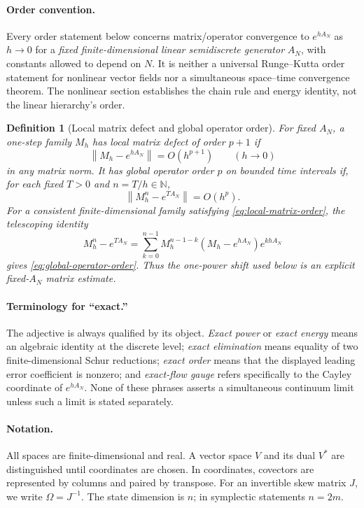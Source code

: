\documentclass[11pt,a4paper]{article}
\newtheorem{definition}[theorem]{Definition}
\newcommand{\norm}[1]{\left\lVert #1\right\rVert}
\begin{document}
\paragraph{Order convention.}
Every order statement below concerns matrix/operator convergence to
\(e^{hA_N}\) as \(h\to0\) for a \emph{fixed finite-dimensional linear
semidiscrete generator} \(A_N\), with constants allowed to depend on
\(N\).  It is neither a universal Runge--Kutta order statement for
nonlinear vector fields nor a simultaneous space--time convergence
theorem.  The nonlinear section establishes the chain rule and energy
identity, not the linear hierarchy's order.

\begin{definition}[Local matrix defect and global operator order]
\label{def:matrix-order}
For fixed \(A_N\), a one-step family \(M_h\) has \emph{local matrix defect
of order \(p+1\)} if
\begin{equation}\label{eq:local-matrix-order}
 \norm{M_h-e^{hA_N}}=O(h^{p+1})\qquad(h\to0)
\end{equation}
in any matrix norm.  It has \emph{global operator order \(p\)} on bounded
time intervals if, for each fixed \(T>0\) and \(n=T/h\in\mathbb N\),
\begin{equation}\label{eq:global-operator-order}
 \norm{M_h^n-e^{TA_N}}=O(h^p).
\end{equation}
For a consistent finite-dimensional family satisfying
\cref{eq:local-matrix-order}, the telescoping identity
\[
 M_h^n-e^{TA_N}
 =\sum_{k=0}^{n-1}M_h^{n-1-k}
  (M_h-e^{hA_N})e^{khA_N}
\]
gives \cref{eq:global-operator-order}.  Thus the one-power shift used
below is an explicit fixed-\(A_N\) matrix estimate.
\end{definition}

\paragraph{Terminology for ``exact.''}
The adjective is always qualified by its object.  \emph{Exact power} or
\emph{exact energy} means an algebraic identity at the discrete level;
\emph{exact elimination} means equality of two finite-dimensional Schur
reductions; \emph{exact order} means that the displayed leading error
coefficient is nonzero; and \emph{exact-flow gauge} refers specifically to
the Cayley coordinate of \(e^{hA_N}\).  None of these phrases asserts a
simultaneous continuum limit unless such a limit is stated separately.

\paragraph{Notation.}
All spaces are finite-dimensional and real. A vector space \(V\) and its
dual \(V^*\) are distinguished until coordinates are chosen. In
coordinates, covectors are represented by columns and paired by transpose.
For an invertible skew matrix \(J\), we write \(\Omega=J^{-1}\).
The state dimension is \(n\); in symplectic statements \(n=2m\).
\end{document}
